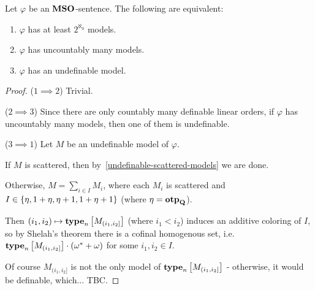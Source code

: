 \begin{theorem}\label{undefinable-models}
    Let $\varphi$ be an $\mathbf{MSO}$-sentence. The following are equivalent:
    \begin{enumerate}
        \item $\varphi$ has at least $2^{\aleph_0}$ models.
        \item $\varphi$ has uncountably many models.
        \item $\varphi$ has an undefinable model.
    \end{enumerate}
\end{theorem}

\begin{proof}
    ($1 \implies 2$) Trivial.

    ($2 \implies 3$) Since there are only countably many
    definable linear orders,
    if $\varphi$ has uncountably many models,
    then one of them is undefinable.

    ($3 \implies 1$)
    Let $M$ be an undefinable model of $\varphi$.

    If $M$ is scattered, then by~\cref{undefinable-scattered-models}
    we are done.

    Otherwise, $M = \sum_{i \in I} M_i$,
    where each $M_i$ is scattered and
    $I \in \left\{ {\eta, 1 + \eta, \eta + 1, 1 + \eta + 1} \right\}$
    (where $\eta = \mathbf{otp}_{\mathbf{Q}}$).

    Then $(i_1, i_2) \mapsto \mathbf{type}_{n} \left[ {M_{(i_1, i_2]}} \right]$ (where $i_1 < i_2$)
    induces an additive coloring of $I$, so by Shelah's theorem
    there is a cofinal homogenous set,
    i.e. $\mathbf{type}_{n} \left[ {M_{(i_1, i_2]}} \right] \cdot (\omega^\ast + \omega)$ for some
    $i_1, i_2 \in I$.

    Of course $M_{(i_1, i_2]}$ is not the only model of $\mathbf{type}_{n} \left[ {M_{(i_1, i_2]}} \right]$
    - otherwise, it would be definable, which... TBC.
\end{proof}